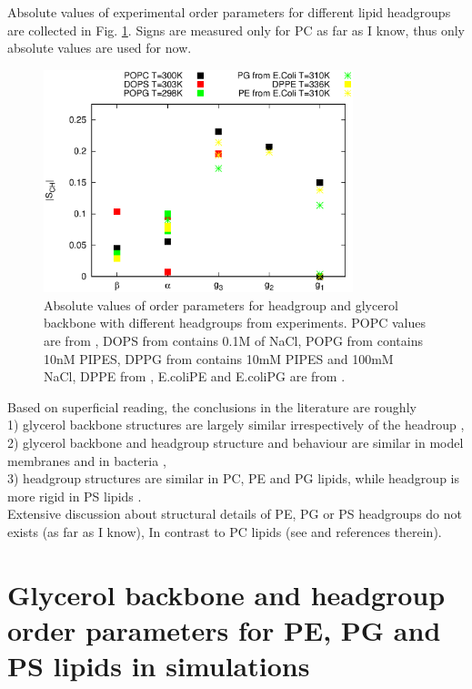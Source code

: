 \documentclass[aps,prl,superscriptaddress,twocolumn]{revtex4}
\begin{document}
Absolute values of experimental order parameters for different lipid headgroups are
collected in Fig. \ref{HGorderParameters}. Signs are measured only for PC as far as I know,
thus only absolute values are used for now.
\begin{figure}[]
  \centering
  \includegraphics[width=9.0cm]{../Figs/HGorderparameters.eps}
  \caption{\label{HGorderParameters}
    Absolute values of order parameters for headgroup and glycerol backbone with different headgroups
    from experiments. POPC values are from \cite{ferreira13}, DOPS from \cite{browning80} contains 0.1M of NaCl,
    POPG from \cite{borle85} contains 10nM PIPES, DPPG from \cite{wohlgemuth80} contains  10mM PIPES and 100mM NaCl,
    DPPE from \cite{seelig76}, E.coliPE and E.coliPG are from \cite{gally81}.
  }
\end{figure}

Based on superficial reading, the conclusions in the literature are roughly \\ 
1) glycerol backbone structures are largely similar irrespectively of the headroup \cite{gally81}, \\
2) glycerol backbone and headgroup structure and behaviour are similar in model membranes and in bacteria \cite{gally81,scherer87,seelig90}, \\
3) headgroup structures are similar in PC, PE and PG lipids, while headgroup is more rigid in PS lipids \cite{wohlgemuth80,buldt81}. \\
Extensive discussion about structural details of PE, PG or PS headgroups do not exists (as far as I know), 
In contrast to PC lipids (see \cite{botan15} and references therein).


\section{Glycerol backbone and headgroup order parameters for PE, PG and PS lipids in simulations}
\end{document}
